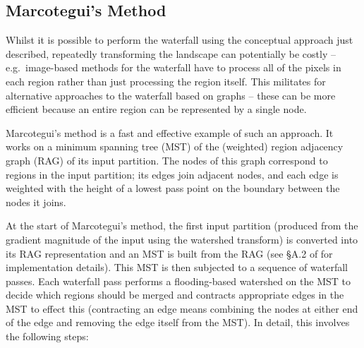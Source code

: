 \documentclass[preprint,a4paper]{elsarticle}
\begin{document}
\subsection{Marcotegui's Method}

Whilst it is possible to perform the waterfall using the conceptual approach just described, repeatedly transforming the landscape can potentially be costly -- e.g.~image-based methods for the waterfall have to process all of the pixels in each region rather than just processing the region itself. This militates for alternative approaches to the waterfall based on graphs -- these can be more efficient because an entire region can be represented by a single node.

Marcotegui's method \cite{marcotegui05} is a fast and effective example of such an approach. It works on a minimum spanning tree (MST) of the (weighted) region adjacency graph (RAG) of its input partition\footnotemark{}. The nodes of this graph correspond to regions in the input partition; its edges join adjacent nodes, and each edge is weighted with the height of a lowest pass point on the boundary between the nodes it joins.


At the start of Marcotegui's method, the first input partition (produced from the gradient magnitude of the input using the watershed transform) is converted into its RAG representation and an MST is built from the RAG (see \S{}A.2 of \cite{golodetz11} for implementation details). This MST is then subjected to a sequence of waterfall passes. Each waterfall pass performs a flooding-based watershed on the MST to decide which regions should be merged and contracts appropriate edges in the MST to effect this (contracting an edge means combining the nodes at either end of the edge and removing the edge itself from the MST)\footnotemark{}. In detail, this involves the following steps:

\end{document}
